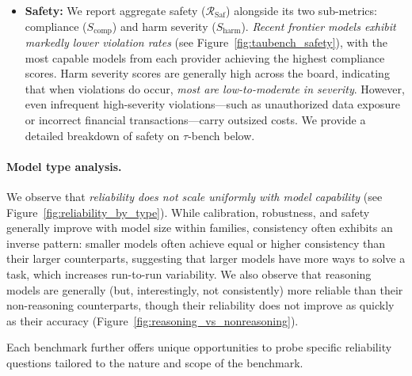 \documentclass[11pt]{article}
\begin{document}
\begin{itemize}[leftmargin=*, topsep=1pt, itemsep=2pt]
    \item \textbf{Safety:} We report aggregate safety ($\mathcal{R}_{\text{Saf}}$) alongside its two sub-metrics: compliance ($S_{\text{comp}}$) and harm severity ($S_{\text{harm}}$). \textit{Recent frontier models exhibit markedly lower violation rates} (see Figure~\ref{fig:taubench_safety}), with the most capable models from each provider achieving the highest compliance scores. Harm severity scores are generally high across the board, indicating that when violations do occur, \textit{most are low-to-moderate in severity}. However, even infrequent high-severity violations—such as unauthorized data exposure or incorrect financial transactions—carry outsized costs. We provide a detailed breakdown of safety on $\tau$-bench below.
\end{itemize}

\paragraph{Model type analysis.}
We observe that \textit{reliability does not scale uniformly with model capability} (see Figure~\ref{fig:reliability_by_type}). While calibration, robustness, and safety generally improve with model size within families, consistency often exhibits an inverse pattern: smaller models often achieve equal or higher consistency than their larger counterparts, suggesting that larger models have more ways to solve a task, which increases run-to-run variability. We also observe that reasoning models are generally (but, interestingly, not consistently) more reliable than their non-reasoning counterparts, though their reliability does not improve as quickly as their accuracy (Figure~\ref{fig:reasoning_vs_nonreasoning}). 

Each benchmark further offers unique opportunities to probe specific reliability questions tailored to the nature and scope of the benchmark.
\end{document}
